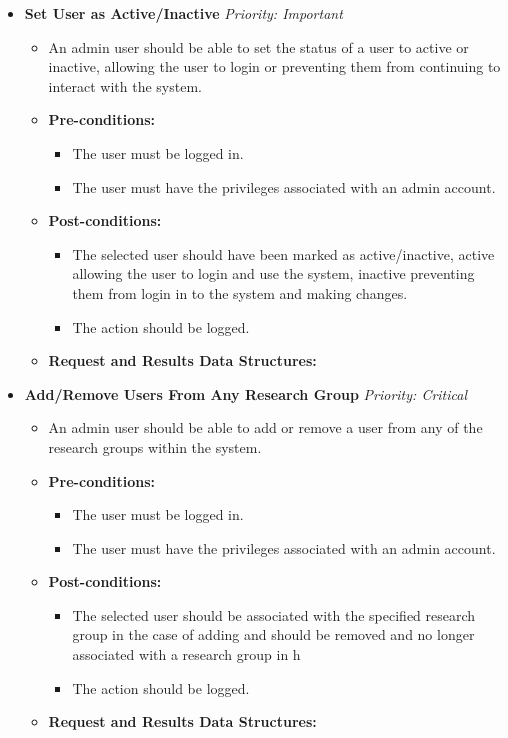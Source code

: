 \documentclass{article}
\begin{document}
\begin{itemize}
					\cleardoublepage
					\item \textbf{Set User as Active/Inactive} \hfill \textit{Priority: Important}
					\begin{itemize}
						\item An admin user should be able to set the status of a user to active or inactive, allowing the user to login or preventing them from continuing to interact with the system.
						\item \textbf{Pre-conditions:}
						\begin{itemize}
							\item The user must be logged in.
							\item The user must have the privileges associated with an admin account.
						\end{itemize}
						\item \textbf{Post-conditions:}
						\begin{itemize}
							\item The selected user should have been marked as active/inactive, active allowing the user to login and use the system, inactive preventing them from login in to the system and making changes.
							\item The action should be logged.
						\end{itemize}
						\item \textbf{Request and Results Data Structures:}
					\end{itemize}
					
					\item \textbf{Add/Remove Users From Any Research Group} \hfill \textit{Priority: Critical}
					\begin{itemize}
						\item An admin user should be able to add or remove a user from any of the research groups within the system.
						\item \textbf{Pre-conditions:}
						\begin{itemize}
							\item The user must be logged in.
							\item The user must have the privileges associated with an admin account.
						\end{itemize}
						\item \textbf{Post-conditions:}
						\begin{itemize}
							\item The selected user should be associated with the specified research group in the case of adding and should be removed and no longer associated with a research group in h
							\item The action should be logged.
						\end{itemize}
						\item \textbf{Request and Results Data Structures:}
					\end{itemize}
				\end{itemize}
\end{document}
